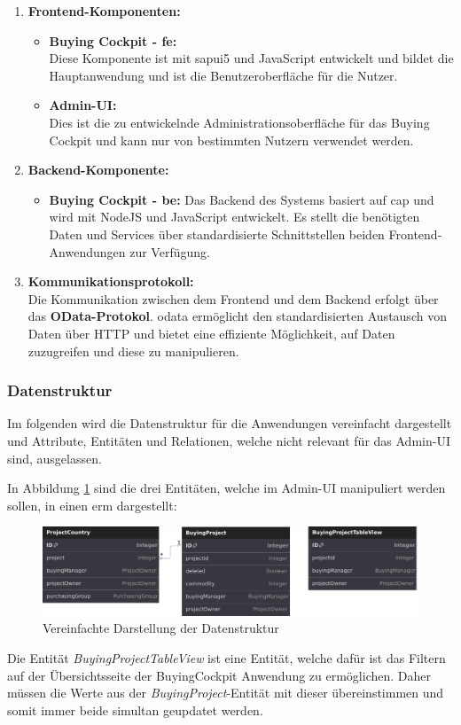 \begin{enumerate}
    \item \textbf{Frontend-Komponenten:}
    \begin{itemize}
        \item \textbf{Buying Cockpit - \gls{fe}:} \\
        Diese Komponente ist mit \gls{sapui5} und JavaScript entwickelt und bildet die Hauptanwendung und ist die Benutzeroberfläche für die Nutzer.
        \item \textbf{Admin-UI:} \\
        Dies ist die zu entwickelnde Administrationsoberfläche für das Buying Cockpit und  kann nur von bestimmten Nutzern verwendet werden.
    \end{itemize} 
    \item \textbf{Backend-Komponente:}
    \begin{itemize}
        \item \textbf{Buying Cockpit - \gls{be}:}
        Das Backend des Systems basiert auf \gls{cap} und wird mit NodeJS und JavaScript entwickelt.
        Es stellt die benötigten Daten und Services über standardisierte Schnittstellen beiden Frontend-Anwendungen zur Verfügung.
    \end{itemize}
    \item \textbf{Kommunikationsprotokoll:} \\
    Die Kommunikation zwischen dem Frontend und dem Backend erfolgt über das \textbf{OData-Protokol}. 
    \gls{odata} ermöglicht den standardisierten Austausch von Daten über HTTP und bietet eine effiziente Möglichkeit, auf Daten zuzugreifen und diese zu manipulieren.
\end{enumerate}
\subsubsection[Datenstruktur]{Datenstruktur}
Im folgenden wird die Datenstruktur für die Anwendungen vereinfacht dargestellt und Attribute, Entitäten und Relationen, welche nicht relevant für das Admin-UI sind, ausgelassen.

In Abbildung \ref{fig:datastructure} sind die drei Entitäten, welche im Admin-UI manipuliert werden sollen, in einen \gls{erm} dargestellt: \\
\begin{figure}[H]
    \centering
    \includegraphics[width=\linewidth]{Images/Datenstruktur.png}
    \caption[Vereinfachte Darstellung der Datenstruktur]{Vereinfachte Darstellung der Datenstruktur}
    \label{fig:datastructure}
\end{figure}

Die Entität \textit{BuyingProjectTableView} ist eine Entität, welche dafür ist das Filtern auf der Übersichtsseite der BuyingCockpit Anwendung zu ermöglichen.
Daher müssen die Werte aus der \textit{BuyingProject}-Entität mit dieser übereinstimmen und somit immer beide simultan geupdatet werden.